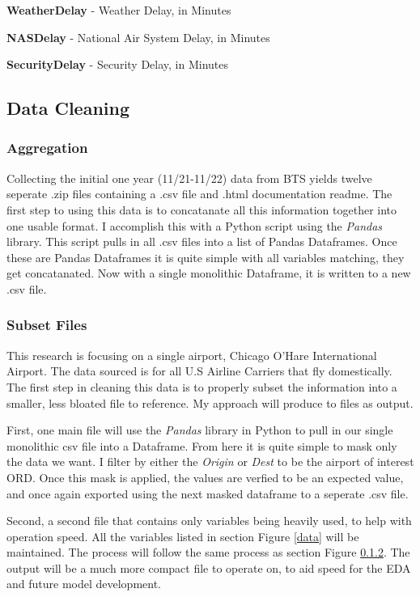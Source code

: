 \documentclass[a4paper,12pt]{article}
\begin{document}
\textbf{WeatherDelay} - Weather Delay, in Minutes

\textbf{NASDelay} - National Air System Delay, in Minutes

\textbf{SecurityDelay} - Security Delay, in Minutes

\subsection{Data Cleaning}

\subsubsection{Aggregation}
Collecting the initial one year (11/21-11/22) data from BTS yields twelve seperate .zip files containing a .csv file and .html documentation readme.
The first step to using this data is to concatanate all this information together into one usable format.
I accomplish this with a Python script using the \emph{Pandas} library. This script pulls in all .csv files into a list of Pandas Dataframes.
Once these are Pandas Dataframes it is quite simple with all variables matching, they get concatanated. 
Now with a single monolithic Dataframe, it is written to a new .csv file.

\subsubsection{Subset Files} \label{datasubset}
This research is focusing on a single airport, Chicago O'Hare International Airport. The data sourced is for all U.S Airline Carriers that fly domestically.
The first step in cleaning this data is to properly subset the information into a smaller, less bloated file to reference. My approach will produce to files as output.

First, one main file will use the \emph{Pandas} library in Python to pull in our single monolithic csv file into a Dataframe. From here it is quite simple to mask only the data we want.
I filter by either the \emph{Origin} or \emph{Dest} to be the airport of interest ORD.
Once this mask is applied, the values are verfied to be an expected value, and once again exported using the next masked dataframe to a seperate .csv file. 

Second, a second file that contains only variables being heavily used, to help with operation speed. All the variables listed in section Figure \ref{data} will be maintained.
The process will follow the same process as section Figure \ref{datasubset}. The output will be a much more compact file to operate on, to aid speed for the EDA and future model development.
\end{document}
